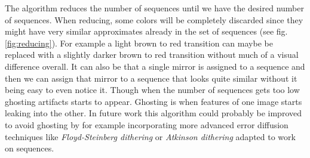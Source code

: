 \documentclass{article}
\begin{document}
The algorithm reduces the number of sequences until we have the desired
number of sequences. When reducing, some colors will be completely
discarded since they might have very similar approximates already in the
set of sequences (see fig. \ref{fig:reducing}). For example a light brown to red transition can maybe
be replaced with a slightly darker brown to red transition without much
of a visual difference overall. It can also be that a single mirror is
assigned to a sequence and then we can assign that mirror to a sequence
that looks quite similar without it being easy to even notice it. Though
when the number of sequences gets too low ghosting artifacts starts to
appear. Ghosting is when features of one image starts leaking into the
other. In future work this algorithm could probably be improved to avoid
ghosting by for example incorporating more advanced error diffusion
techniques like \emph{Floyd-Steinberg dithering} or \emph{Atkinson
dithering} adapted to work on sequences.
\end{document}
